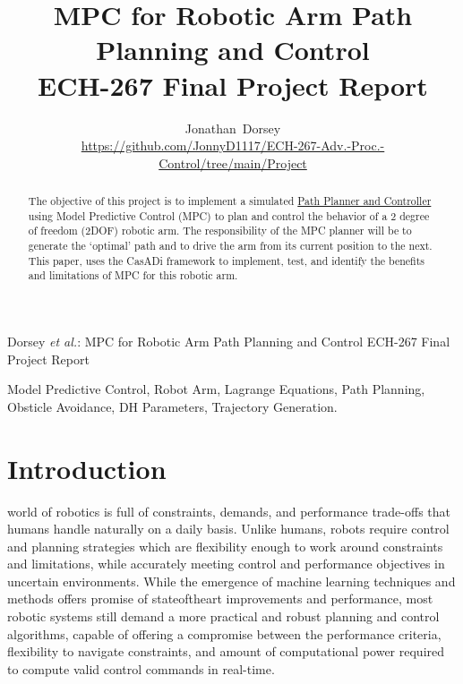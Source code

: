 \documentclass[journal]{IEEEtran}
\begin{document}
\title{MPC for Robotic Arm Path Planning and Control \\ ECH-267 Final Project Report}


\author{Jonathan~Dorsey  \\  \url{https://github.com/JonnyD1117/ECH-267-Adv.-Proc.-Control/tree/main/Project}}


%
{Dorsey \MakeLowercase{\textit{et al.}}: MPC for Robotic Arm Path Planning and Control ECH-267 Final Project Report}

\maketitle

\begin{abstract}
  The objective of this project is to implement a simulated \underline{Path Planner and Controller} using Model Predictive Control (MPC) to plan and control the behavior of a 2 degree of freedom (2DOF) robotic arm. The responsibility of the MPC planner will be to generate the `optimal' path and to drive the arm from its current position to the next. This paper, uses the CasADi framework to implement, test, and identify the benefits and limitations of MPC for this robotic arm.
\end{abstract}

\begin{IEEEkeywords}
Model Predictive Control, Robot Arm, Lagrange Equations, Path Planning, Obsticle Avoidance, DH Parameters, Trajectory Generation.
\end{IEEEkeywords}


\IEEEpeerreviewmaketitle

\section{Introduction}

 world of robotics is full of constraints, demands, and performance trade-offs that humans handle naturally on a daily basis. Unlike humans, robots require control and planning strategies which are flexibility enough to work around constraints and limitations, while accurately meeting control and performance objectives in uncertain environments. While the emergence of machine learning techniques and methods offers promise of stateoftheart improvements and performance, most robotic systems still demand a more practical and robust planning and control algorithms, capable of offering a compromise between the performance criteria, flexibility to navigate constraints, and amount of computational power required to compute valid control commands in real-time. \\
\end{document}
